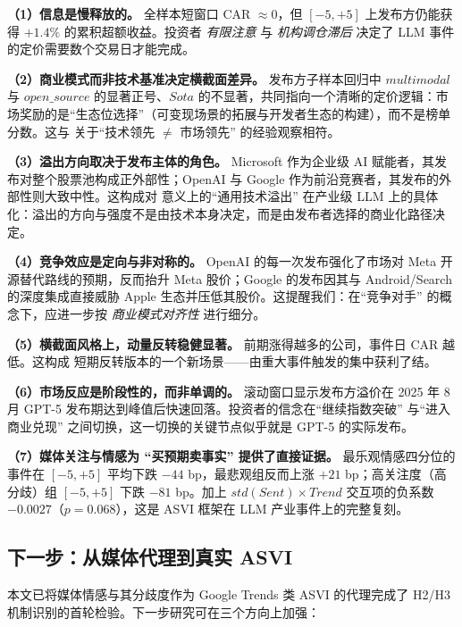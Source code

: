 \documentclass[11pt]{ctexart}
\begin{document}
\textbf{（1）信息是慢释放的。} 全样本短窗口 CAR $\approx 0$，但 $[-5,+5]$ 上发布方仍能获得 $+1.4\%$ 的累积超额收益。投资者 \emph{有限注意} 与 \emph{机构调仓滞后} 决定了 LLM 事件的定价需要数个交易日才能完成。

\textbf{（2）商业模式而非技术基准决定横截面差异。} 发布方子样本回归中 $multimodal$ 与 $open\_source$ 的显著正号、$Sota$ 的不显著，共同指向一个清晰的定价逻辑：市场奖励的是“生态位选择”（可变现场景的拓展与开发者生态的构建），而不是榜单分数。这与 \cite{GoldfarbTucker2019} 关于“技术领先 $\neq$ 市场领先” 的经验观察相符。

\textbf{（3）溢出方向取决于发布主体的角色。} Microsoft 作为企业级 AI 赋能者，其发布对整个股票池构成正外部性；OpenAI 与 Google 作为前沿竞赛者，其发布的外部性则大致中性。这构成对 \cite{Bresnahan2010} 意义上的“通用技术溢出” 在产业级 LLM 上的具体化：溢出的方向与强度不是由技术本身决定，而是由发布者选择的商业化路径决定。

\textbf{（4）竞争效应是定向与非对称的。} OpenAI 的每一次发布强化了市场对 Meta 开源替代路线的预期，反而抬升 Meta 股价；Google 的发布因其与 Android/Search 的深度集成直接威胁 Apple 生态并压低其股价。这提醒我们：在“竞争对手” 的概念下，应进一步按 \emph{商业模式对齐性} 进行细分。

\textbf{（5）横截面风格上，动量反转稳健显著。} 前期涨得越多的公司，事件日 CAR 越低。这构成 \cite{JegadeeshTitman1993} 短期反转版本的一个新场景——由重大事件触发的集中获利了结。

\textbf{（6）市场反应是阶段性的，而非单调的。} 滚动窗口显示发布方溢价在 2025 年 8 月 GPT-5 发布期达到峰值后快速回落。投资者的信念在“继续指数突破” 与“进入商业兑现” 之间切换，这一切换的关键节点似乎就是 GPT-5 的实际发布。

\textbf{（7）媒体关注与情感为 “买预期卖事实” 提供了直接证据。} 最乐观情感四分位的事件在 $[-5,+5]$ 平均下跌 $-44$ bp，最悲观组反而上涨 $+21$ bp；高关注度（高分歧）组 $[-5,+5]$ 下跌 $-81$ bp。加上 $std(Sent)\times Trend$ 交互项的负系数 $-0.0027$（$p=0.068$），这是 \cite{DaEngelbergGao2011} ASVI 框架在 LLM 产业事件上的完整复刻。

\subsection{下一步：从媒体代理到真实 ASVI}

本文已将媒体情感与其分歧度作为 Google Trends 类 ASVI 的代理完成了 H2/H3 机制识别的首轮检验。下一步研究可在三个方向上加强：
\end{document}
